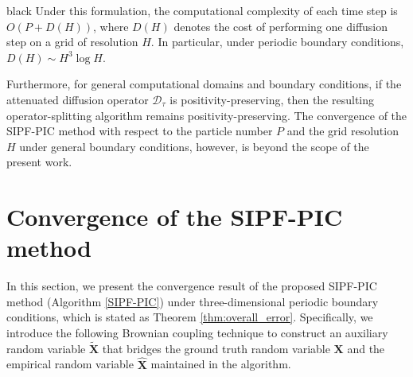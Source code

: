 \documentclass[review,onefignum,onetabnum]{siamart250211}
\begin{document}
\begin{color}{black}
Under this formulation, the computational complexity of each time step is
$O(P+D(H))$,
where $D(H)$ denotes the cost of performing one diffusion step on a grid of resolution $H$. In particular, under periodic boundary conditions,
$D(H) \sim H^3\log H$.

Furthermore, for general computational domains and boundary conditions, if the attenuated diffusion operator $\mathcal{D}_{\tau}$ is positivity-preserving, then the resulting operator-splitting algorithm remains positivity-preserving. The convergence of the SIPF-PIC method with respect to the particle number $P$ and the grid resolution $H$ under general boundary conditions, however, is beyond the scope of the present work.
\end{color}
\section{Convergence of the SIPF-PIC method}
\label{sec:Error}
In this section, we present the convergence result of the proposed SIPF-PIC method (Algorithm \ref{SIPF-PIC}) under three-dimensional periodic boundary conditions, which is stated as Theorem \ref{thm:overall_error}. Specifically, we introduce the following Brownian coupling technique to construct an auxiliary random variable $\widetilde{\mathbf{X}}$ that bridges the ground truth random variable $\mathbf{X}$ and the empirical random variable $\widehat{\mathbf{X}}$ maintained in the algorithm.
\end{document}
